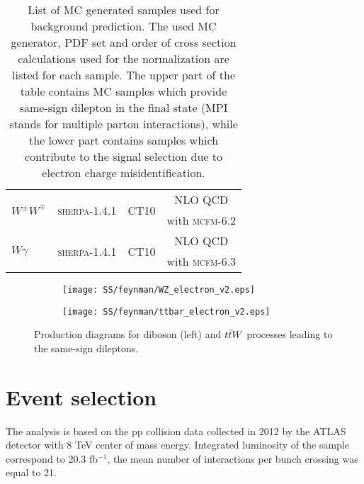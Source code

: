 \begin{table}[ht]
\begin{center}
\begin{tabular}{l|c|c|c}
\multirow{2}{*}{$W^{\pm}W^{\mp}$} & \multirow{2}{*}{{\scshape sherpa-1.4.1}} & \multirow{2}{*}{CT10}& NLO QCD \\
& &  & with {\scshape mcfm-6.2}\\
\hline
\multirow{2}{*}{$W\gamma$} & \multirow{2}{*}{{\scshape sherpa}-1.4.1} & \multirow{2}{*}{CT10}& NLO QCD\\
& &  & with {\scshape mcfm-6.3}\\
\hline
\end{tabular}
\end{center}
  \caption{List of MC generated samples used for background prediction. 
  The used MC generator, PDF set and order of cross section calculations used for the normalization are listed for each sample.
  The upper part of the table contains MC samples which provide same-sign dilepton in the final state
  (MPI stands for multiple parton interactions), 
  while the lower part contains samples which contribute to the signal selection due to electron charge misidentification.}
\label{tab:MC_cross}
\end{table}

\begin{figure}

\begin{subfigure}{.5\textwidth}
  \centering
  \texttt{[image: SS/feynman/WZ\_electron\_v2.eps]}
\end{subfigure}%
\begin{subfigure}{.5\textwidth}
  \centering
  \texttt{[image: SS/feynman/ttbar\_electron\_v2.eps]}
\end{subfigure}

\caption{Production diagrams for diboson (left) and $t\bar{t} W$ processes leading to the same-sign dileptons.}
  \label{fig:prompt_bkg_feynman_diag}
\end{figure}


\section{Event selection}

The analysis is based on the pp collision data collected in 2012 by the ATLAS detector with 8 TeV center of mass energy.
Integrated luminosity of the sample correspond to 20.3 fb$^{-1}$, the mean number of interactions per bunch crossing was equal to 21.

